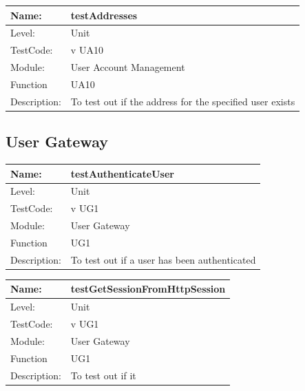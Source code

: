 \documentclass[12pt]{article}
\begin{document}
\begin{center}
\begin{tabular}{|l|p{12cm}|}
\hline

 Name: & testAddresses\\
\hline
Level: & Unit \\
\hline
TestCode: & v UA10 \\
\hline
Module:& User Account Management\\
\hline
Function & UA10 \\
\hline
Description: & To test out if the address for the specified user exists \\
\hline

\end{tabular}
\end{center}

\subsection{User Gateway}
\begin{center}
\begin{tabular}{|l|p{12cm}|}
\hline

 Name: & testAuthenticateUser \\
\hline
Level: & Unit \\
\hline
TestCode: & v UG1 \\
\hline
Module:& User Gateway\\
\hline
Function & UG1 \\
\hline
Description: & To test out if a user has been authenticated \\
\hline

\end{tabular}
\end{center}

\begin{center}
\begin{tabular}{|l|p{12cm}|}
\hline

 Name: & testGetSessionFromHttpSession \\
\hline
Level: & Unit \\
\hline
TestCode: & v UG1 \\
\hline
Module:& User Gateway\\
\hline
Function & UG1 \\
\hline
Description: & To test out if it  \\
\hline

\end{tabular}
\end{center}
\end{document}
